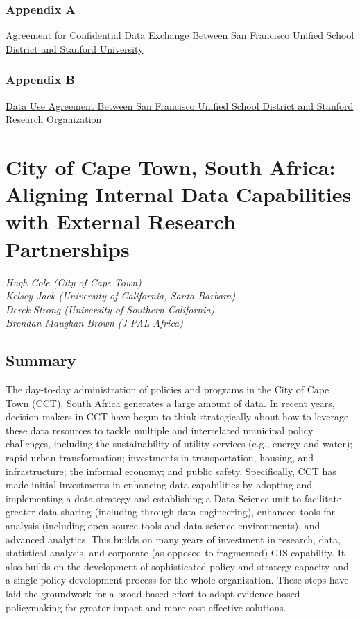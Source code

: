 \documentclass[
]{book}
\begin{document}
\hypertarget{appendix-a-2}{%
\subsection*{Appendix A}\label{appendix-a-2}}

\href{./appendix/sfusd_appendix_a.pdf}{Agreement for Confidential Data Exchange Between San Francisco Unified School District and Stanford University}

\hypertarget{appendix-b-2}{%
\subsection*{Appendix B}\label{appendix-b-2}}

\href{./appendix/sfusd_appendix_b.pdf}{Data Use Agreement Between San Francisco Unified School District and Stanford Research Organization}

\hypertarget{cct}{%
\chapter{City of Cape Town, South Africa: Aligning Internal Data Capabilities with External Research Partnerships}\label{cct}}

\emph{Hugh Cole (City of Cape Town)}\\
\emph{Kelsey Jack (University of California, Santa Barbara)}\\
\emph{Derek Strong (University of Southern California)}\\
\emph{Brendan Maughan-Brown (J-PAL Africa)}

\hypertarget{summary-7}{%
\section{Summary}\label{summary-7}}

The day-to-day administration of policies and programs in the City of Cape Town (CCT), South Africa generates a large amount of data. In recent years, decision-makers in CCT have begun to think strategically about how to leverage these data resources to tackle multiple and interrelated municipal policy challenges, including the sustainability of utility services (e.g., energy and water); rapid urban transformation; investments in transportation, housing, and infrastructure; the informal economy; and public safety. Specifically, CCT has made initial investments in enhancing data capabilities by adopting and implementing a data strategy and establishing a Data Science unit to facilitate greater data sharing (including through data engineering), enhanced tools for analysis (including open-source tools and data science environments), and advanced analytics. This builds on many years of investment in research, data, statistical analysis, and corporate (as opposed to fragmented) GIS capability. It also builds on the development of sophisticated policy and strategy capacity and a single policy development process for the whole organization. These steps have laid the groundwork for a broad-based effort to adopt evidence-based policymaking for greater impact and more cost-effective solutions.
\end{document}
